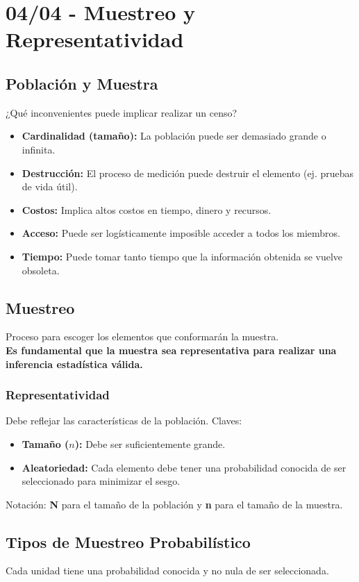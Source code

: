 \documentclass[12pt, letterpaper]{article}
\begin{document}
\section{04/04 - Muestreo y Representatividad}
\subsection{Población y Muestra}
¿Qué inconvenientes puede implicar realizar un censo?
\begin{itemize}
    \item \textbf{Cardinalidad (tamaño):} La población puede ser demasiado grande o infinita.
    \item \textbf{Destrucción:} El proceso de medición puede destruir el elemento (ej. pruebas de vida útil).
    \item \textbf{Costos:} Implica altos costos en tiempo, dinero y recursos.
    \item \textbf{Acceso:} Puede ser logísticamente imposible acceder a todos los miembros.
    \item \textbf{Tiempo:} Puede tomar tanto tiempo que la información obtenida se vuelve obsoleta.
\end{itemize}

\subsection{Muestreo}
Proceso para escoger los elementos que conformarán la muestra. \\
\textbf{Es fundamental que la muestra sea representativa para realizar una inferencia estadística válida.}

\subsubsection{Representatividad}
Debe reflejar las características de la población. Claves:
\begin{itemize}
    \item \textbf{Tamaño ($n$):} Debe ser suficientemente grande.
    \item \textbf{Aleatoriedad:} Cada elemento debe tener una probabilidad conocida de ser seleccionado para minimizar el sesgo.
\end{itemize}
Notación: \textbf{N} para el tamaño de la población y \textbf{n} para el tamaño de la muestra.

\subsection{Tipos de Muestreo Probabilístico}
Cada unidad tiene una probabilidad conocida y no nula de ser seleccionada.
\end{document}
